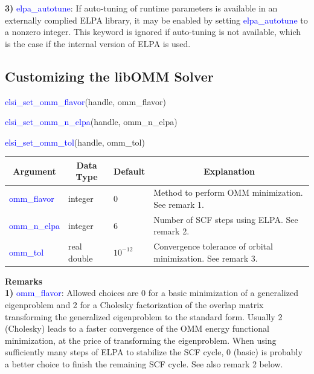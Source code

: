 \documentclass{report}
\begin{document}
\textbf{3)} \textcolor{blue}{elpa\_autotune}:  If auto-tuning of runtime parameters is available in an externally complied ELPA library, it may be enabled by setting \textcolor{blue}{elpa\_autotune} to a nonzero integer.  This keyword is ignored if auto-tuning is not available, which is the case if the internal version of ELPA is used.\\

\subsection{Customizing the libOMM Solver}
\label{subsec:setter_omm}
\begin{labeling}{\hspace{6cm}}
\item [\hspace{0.3cm} \textcolor{blue}{elsi\_set\_omm\_flavor}(handle, omm\_flavor)]
\item [\hspace{0.3cm} \textcolor{blue}{elsi\_set\_omm\_n\_elpa}(handle, omm\_n\_elpa)]
\item [\hspace{0.3cm} \textcolor{blue}{elsi\_set\_omm\_tol}(handle, omm\_tol)]
\end{labeling}

\begin{tabular}[]{|p{30mm}|p{20mm}|p{15mm}|p{100mm}|}
\hline
\multicolumn{1}{|c|}{\textbf{Argument}} & \multicolumn{1}{c|}{\textbf{Data Type}} & \multicolumn{1}{c|}{\textbf{Default}} & \multicolumn{1}{c|}{\textbf{Explanation}}\\
\hline
\textcolor{blue}{omm\_flavor}  & integer     & 0          & Method to perform OMM minimization.  See remark 1.\\
\hline
\textcolor{blue}{omm\_n\_elpa} & integer     & 6          & Number of SCF steps using ELPA.  See remark 2.\\
\hline
\textcolor{blue}{omm\_tol}     & real double & $10^{-12}$ & Convergence tolerance of orbital minimization.  See remark 3.\\
\hline
\end{tabular}

\bigskip
\textbf{Remarks}\\

\textbf{1)} \textcolor{blue}{omm\_flavor}:  Allowed choices are 0 for a basic minimization of a generalized eigenproblem and 2 for a Cholesky factorization of the overlap matrix transforming the generalized eigenproblem to the standard form.  Usually 2 (Cholesky) leads to a faster convergence of the OMM energy functional minimization, at the price of transforming the eigenproblem.  When using sufficiently many steps of ELPA to stabilize the SCF cycle, 0 (basic) is probably a better choice to finish the remaining SCF cycle.  See also remark 2 below.\\
\end{document}
